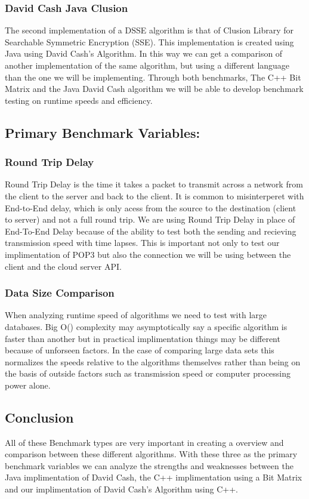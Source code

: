 \documentclass[onecolumn, draftclsnofoot,10pt, compsoc]{IEEEtran}
\begin{document}
\subsubsection {David Cash Java Clusion}
	The second implementation of a DSSE algorithm is that of Clusion Library for Searchable Symmetric Encryption (SSE). This implementation is created using Java using David Cash’s Algorithm. In this way we can get a comparison of another implementation of the same algorithm, but using a different language than the one we will be implementing. Through both benchmarks, The C++ Bit Matrix and the Java David Cash algorithm we will be able to develop benchmark testing on runtime speeds and efficiency.

\subsection{ Primary Benchmark Variables: }
\subsubsection{ Round Trip Delay }
Round Trip Delay is the time it takes a packet to transmit across a network from the client to the server and back to the client. It is common to misinterperet with End-to-End delay, which is only acess from the source to the destination (client to server) and not a full round trip. We are using Round Trip Delay in place of End-To-End Delay because of the ability to test both the sending and recieving transmission speed with time lapses. This is important not only to test our implimentation of POP3 but also the connection we will be using between the client and the cloud server API.


\subsubsection{ Data Size Comparison }
When analyzing runtime speed of algorithms we need to test with large databases. Big O() complexity may asymptotically say a specific algorithm is faster than another but in practical implimentation things may be different because of unforseen factors. In the case of comparing large data sets this normalizes the speeds relative to the algorithms themselves rather than being on the basis of outside factors such as transmission speed or computer processing power alone.



\subsection{ Conclusion }
All of these Benchmark types are very important in creating a overview and comparison between these different algorithms. With these three as the primary benchmark variables we can analyze the strengths and weaknesses between the Java implimentation of David Cash, the C++ implimentation using a Bit Matrix and our implimentation of David Cash's Algorithm using C++.
\end{document}

